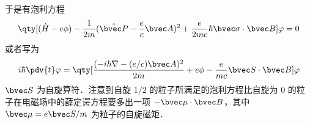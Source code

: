 于是有泡利方程
\begin{equation}
\qty[(\hat H-e\phi)-\frac{1}{2m}(\hat{\bvec P}-\frac{e}{c}\bvec A)^2+\frac{e}{2mc}\hbar\bvec \sigma\cdot \bvec B]\varphi=0
\end{equation}
或者写为
\begin{equation}
i\hbar\pdv{t} \varphi = \qty[\frac{(-i\hbar\nabla - (e/c)\bvec A)^2}{2m}+e\phi-\frac{e}{mc}\bvec S\cdot \bvec B]\varphi
\end{equation}
$\bvec S$ 为自旋算符．注意到自旋 $1/2$ 的粒子所满足的泡利方程比自旋为 $0$ 的粒子在电磁场中的薛定谔方程要多出一项 $-\bvec \mu\cdot \bvec B$，其中 $\bvec \mu=e\bvec S/m$ 为粒子的自旋磁矩．